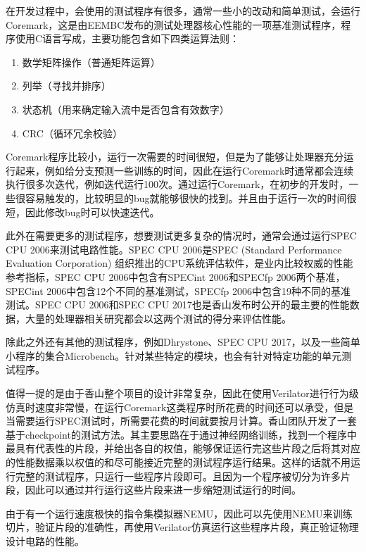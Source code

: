 在开发过程中，会使用的测试程序有很多，通常一些小的改动和简单测试，会运行Coremark，这是由EEMBC发布的测试处理器核心性能的一项基准测试程序，程序使用C语言写成，主要功能包含如下四类运算法则：

\begin{enumerate}
	\item 数学矩阵操作（普通矩阵运算）
	\item 列举（寻找并排序）
	\item 状态机（用来确定输入流中是否包含有效数字）
	\item CRC（循环冗余校验）
\end{enumerate}

Coremark程序比较小，运行一次需要的时间很短，但是为了能够让处理器充分运行起来，例如给分支预测一些训练的时间，因此在运行Coremark时通常都会连续执行很多次迭代，例如迭代运行100次。通过运行Coremark，在初步的开发时，一些很容易触发的，比较明显的bug就能够很快的找到。并且由于运行一次的时间很短，因此修改bug时可以快速迭代。

此外在需要更多的测试程序，想要测试更多复杂的情况时，通常会通过运行SPEC CPU 2006\cite{spec-2006}来测试电路性能。SPEC CPU 2006是SPEC (Standard Performance Evaluation Corporation) 组织推出的CPU系统评估软件，是业内比较权威的性能参考指标，SPEC CPU 2006中包含有SPECint 2006和SPECfp 2006两个基准，SPECint 2006中包含12个不同的基准测试，SPECfp 2006中包含19种不同的基准测试。SPEC CPU 2006和SPEC CPU 2017也是香山发布时公开的最主要的性能数据，大量的处理器相关研究都会以这两个测试的得分来评估性能。

除此之外还有其他的测试程序，例如Dhrystone\cite{dhrystone}、SPEC CPU 2017，以及一些简单小程序的集合Microbench。针对某些特定的模块，也会有针对特定功能的单元测试程序。


值得一提的是由于香山整个项目的设计非常复杂，因此在使用Verilator进行行为级仿真时速度非常慢，在运行Coremark这类程序时所花费的时间还可以承受，但是当需要运行SPEC测试时，所需要花费的时间就要按月计算。香山团队开发了一套基于checkpoint的测试方法。其主要思路在于通过神经网络训练，找到一个程序中最具有代表性的片段，并给出各自的权值，能够保证运行完这些片段之后将其对应的性能数据乘以权值的和尽可能接近完整的测试程序运行结果。这样的话就不用运行完整的测试程序，只运行一些程序片段即可。且因为一个程序被切分为许多片段，因此可以通过并行运行这些片段来进一步缩短测试运行的时间。

由于有一个运行速度极快的指令集模拟器NEMU，因此可以先使用NEMU来训练切片，验证片段的准确性，再使用Verilator仿真运行这些程序片段，真正验证物理设计电路的性能。

